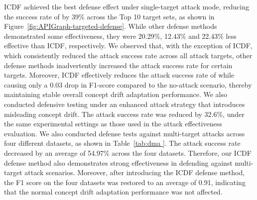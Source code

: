 ICDF achieved the best defense effect under single-target attack mode, reducing the success rate of \pandora by 39\% across the Top 10 target sets, as shown in Figure~\ref{fig:APIGraph-targeted-defense}. 
While other defense methods demonstrated some effectiveness, they were 20.29\%, 12.43\% and 22.43\% less effective than ICDF, respectively.
We observed that, with the exception of ICDF, which consistently reduced the attack success rate across all attack targets, other defense methods inadvertently increased the attack success rate for certain targets.
Moreover, ICDF effectively reduces the attack success rate of \pandora while causing only a 0.03 drop in F1-score compared to the no-attack scenario, thereby maintaining stable overall concept drift adaptation performance.
We also conducted defensive testing under an enhanced attack strategy that introduces misleading concept drift.
The attack success rate was reduced by 32.6\%, under the same experimental settings as those used in the attack effectiveness evaluation.
We also conducted defense tests against multi-target attacks across four different datasets, as shown in Table~\ref{tab:dma }.
The attack success rate decreased by an average of 54.97\% across the four datasets.
Therefore, our ICDF defense method also demonstrates strong effectiveness in defending against multi-target attack scenarios.
Moreover, after introducing the ICDF defense method, the F1 score on the four datasets was restored to an average of 0.91, indicating that the normal concept drift adaptation performance was not affected.
\begin{table}[htbp]
	\caption{ICDF Defense (Multi-Target \pandora)}
	\label{tab:dma }
	\setlength{\tabcolsep}{5.8pt}
	\begin{center}
	\end{center}
\end{table}

